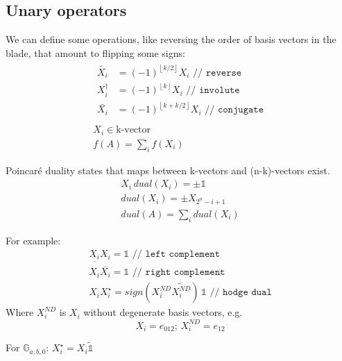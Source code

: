 \documentclass[twoside]{article}
\newcommand{\T}[1]{\textrm{#1}} %
\newcommand{\plusminus}{\pm}
\newcommand{\floor}[1]{{\left\lfloor{#1}\right\rfloor}}
\newcommand{\aside}[1]{\begin{flushright}\scriptsize{#1}\end{flushright}}
\begin{document}
\begin{multicols*}{2}
        \section{Unary operators}
            \par
                We can define some operations, like reversing the order of
                basis vectors in the blade, that amount to flipping some signs:
                \begin{gather*}
                    \begin{aligned}
                        \tilde{X_i} &= (-1)^\floor{k/2} X_i \texttt{ // reverse} \\
                        X_i^\dagger &= (-1)^\floor{k} X_i \texttt{ // involute} \\
                        \bar{X_i} &= (-1)^\floor{k+k/2} X_i \texttt{ // conjugate} \\
                    \end{aligned} \\
                    X_i \in \T{k-vector} \\
                    f(A) = \sum_i f(X_i)
                \end{gather*}
            \par
                Poincaré duality states that maps between k-vectors and (n-k)-vectors exist.
                \begin{gather*}
                    X_i \, dual(X_i) = \plusminus \mathbb{1} \\
                    dual(X_i) = \plusminus X_{2^n-i+1} \\
                    dual(A) = \sum_i dual(X_i)
                \end{gather*}
            \par
                For example:
                \begin{gather*}
                    \underline{X_i} X_i = \mathbb{1} \texttt{ // left complement} \\
                    X_i \overline{X_i} = \mathbb{1} \texttt{ // right complement} \\
                    X_i X_i^\star = sign(X^{ND}_i \widetilde{X^{ND}_i}) \, \mathbb{1} \texttt{ // hodge dual}
                \end{gather*}
                Where $ X^{ND}_i $ is $ X_i $ without degenerate basis vectors, e.g.
                $$ X_i = e_{012}; \, X^{ND}_i = e_{12} $$
                \aside{For $ \mathbb{G}_{a,b,0} $: $ X_i^\star = X_i \tilde{\mathbb{1}} $}

\end{multicols*}
\end{document}
